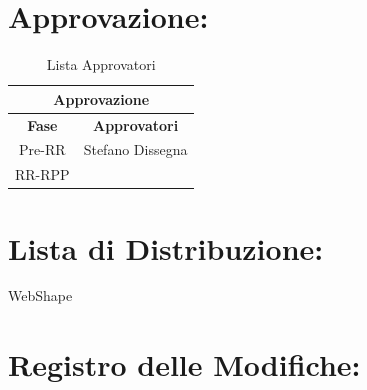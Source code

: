 \section*{\LARGE Approvazione:}

\begin{table}[!h]
	\begin{center}
		\begin{tabular}
			{|c|c|}
			\hline
			\multicolumn{2}{|c|}{ \textbf{Approvazione} } \\
			\hline
			\textbf{Fase} & \textbf{Approvatori} \\
			\hline
			{Pre-RR} & Stefano Dissegna \\
			\hline
			{RR-RPP} & \\
			\hline
		\end{tabular}
		\caption{Lista Approvatori} %
		\label{tabapprovazione}
	\end{center}
\end{table}
\textbf{}

\section*{\LARGE Lista di Distribuzione:}

	\begin{elenconumerato}{\normindent}
		\item WebShape 
	\end{elenconumerato}

\newpage


\section*{\LARGE Registro delle Modifiche:}

